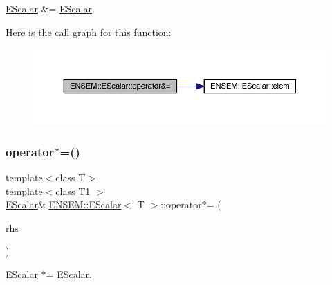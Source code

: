 \mbox{\hyperlink{classENSEM_1_1EScalar}{E\+Scalar}} \&= \mbox{\hyperlink{classENSEM_1_1EScalar}{E\+Scalar}}. 

Here is the call graph for this function\+:
\nopagebreak
\begin{figure}[H]
\begin{center}
\leavevmode
\includegraphics[width=350pt]{d0/d82/classENSEM_1_1EScalar_a4e16e2cecacdfefd6f01dcc360c6945b_cgraph}
\end{center}
\end{figure}
\mbox{\label{classENSEM_1_1EScalar_aa614bef8258a8ea3c2711c4d7d032c1a}} 
\subsubsection{\texorpdfstring{operator$\ast$=()}{operator*=()}\hspace{0.1cm}{\footnotesize\ttfamily [1/3]}}
{\footnotesize\ttfamily template$<$class T$>$ \\
template$<$class T1 $>$ \\
\mbox{\hyperlink{classENSEM_1_1EScalar}{E\+Scalar}}\& \mbox{\hyperlink{classENSEM_1_1EScalar}{E\+N\+S\+E\+M\+::\+E\+Scalar}}$<$ T $>$\+::operator$\ast$= (\begin{DoxyParamCaption}\item[{const \mbox{\hyperlink{classENSEM_1_1EScalar}{E\+Scalar}}$<$ T1 $>$ \&}]{rhs }\end{DoxyParamCaption})\hspace{0.3cm}{\ttfamily [inline]}}



\mbox{\hyperlink{classENSEM_1_1EScalar}{E\+Scalar}} $\ast$= \mbox{\hyperlink{classENSEM_1_1EScalar}{E\+Scalar}}. 

